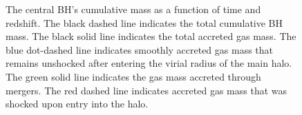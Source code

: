 \documentclass[]{emulateapj}
\begin{document}
\begin{figure}
\centerline{}
\caption[]{The central BH's cumulative mass as a function of time and redshift. The black dashed line indicates the total cumulative BH mass. The black solid line indicates the total accreted gas mass. The blue dot-dashed line indicates smoothly accreted gas mass that remains unshocked after entering the virial radius of the main halo. The green solid line indicates the gas mass accreted through mergers. The red dashed line indicates accreted gas mass that was shocked upon entry into the halo.}
\label{hrh258allmassgas} 
\end{figure}
\end{document}
